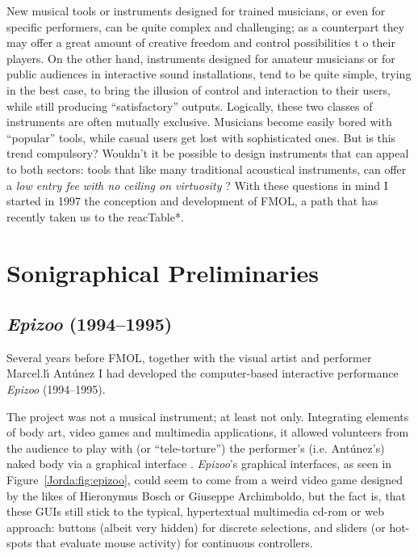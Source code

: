 New musical tools or instruments designed for trained musicians, or even for
specific performers, can be quite complex and challenging;  as a counterpart 
they  may offer a great amount of creative freedom and control possibilities  t o
their players. On the other hand, instruments designed for amateur musicians or
for public audiences in interactive sound installations, tend to be quite
simple, trying in the best case, to bring the illusion  of control  and
interaction  to their users, while still producing ``satisfactory'' outputs. 
Logically,  these two classes of instruments are often mutually exclusive.
Musicians become easily bored with ``popular'' tools, while casual users get lost
with sophisticated ones. But is this trend compulsory? Wouldn't it  be possible 
to  design  instruments that  can  appeal  to   both   sectors:   tools   that  
like   many traditional acoustical instruments, can  offer  a  \textit{low entry  fee
with no ceiling  on  virtuosity} \cite{Wessel:2001}?  With these  questions  in mind I started
in 1997 the conception and development of FMOL, a path that has recently taken us
to the reacTable*.

\section {Sonigraphical Preliminaries}


\subsection{\textit{Epizoo} (1994--1995)}


Several years before FMOL, together with the  visual  artist and performer
Marcel.l\'{\i} Ant\'{u}nez I had developed the computer-based interactive
performance \textit{Epizoo} (1994--1995).

The project was not a musical instrument; at least not only. Integrating
elements of body  art, video games and multimedia applications, it allowed
volunteers from the audience to  play with (or ``tele-torture'') the  performer's
(i.e. Ant\'{u}nez's) naked body via a graphical interface \cite{Gianetti:1998,Jorda:1996,Lozano-Hemmer:1996}. \textit{Epizoo}'s
graphical interfaces, as seen in Figure~\ref{Jorda:fig:epizoo}, could seem to come from a weird
video game designed by the likes of Hieronymus Bosch or Giuseppe Archimboldo, but 
the  fact is, that  these  GUIs still stick to the typical, hypertextual
multimedia cd-rom or web approach: buttons (albeit very hidden) for discrete
selections, and sliders (or hot-spots that evaluate mouse activity) for
continuous  controllers.

